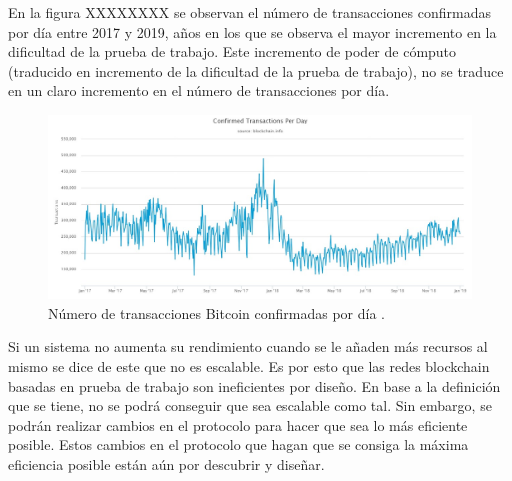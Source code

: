 En la figura XXXXXXXX se observan el número de transacciones confirmadas por día entre 2017 y 2019, años en los que se observa el mayor incremento en la dificultad de la prueba de trabajo. Este incremento de poder de cómputo (traducido en incremento de la dificultad de la prueba de trabajo), no se traduce en un claro incremento en el número de transacciones por día.\newline

\begin{figure}
	\centering
	\includegraphics[width=1\textwidth]{imagenes/confirmed-transactions-per-day.jpeg}
	\caption{\label{fig1}Número de transacciones Bitcoin confirmadas por día \cite{blockchaininfo}.}
\end{figure}

Si un sistema no aumenta su rendimiento cuando se le añaden más recursos al mismo se dice de este que no es escalable. Es por esto que las redes blockchain basadas en prueba de trabajo son ineficientes por diseño. En base a la definición que se tiene, no se podrá conseguir que sea escalable como tal. Sin embargo, se podrán realizar cambios en el protocolo para hacer que sea lo más eficiente posible. Estos cambios en el protocolo que hagan que se consiga la máxima eficiencia posible están aún por descubrir y diseñar. \newline


